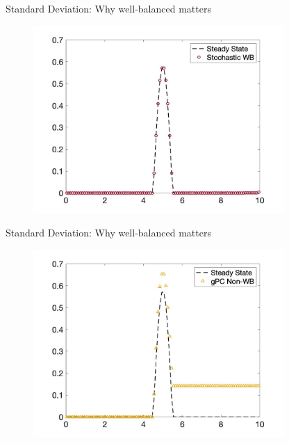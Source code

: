 \documentclass[
    pdf,
    11pt,
    xcolor={svgnames},
  ]{beamer}
\begin{document}
\begin{frame}{Standard Deviation: Why well-balanced matters}
    \begin{figure}
    \centering
    \includegraphics[width=0.85\textwidth]{./Figures/burgers_wb_sd}
    \end{figure}
\end{frame}
\begin{frame}{Standard Deviation: Why well-balanced matters}
    \begin{figure}
    \centering
    \includegraphics[width=0.85\textwidth]{./Figures/burgers_non_sd}
    \end{figure}
\end{frame}
\end{document}
